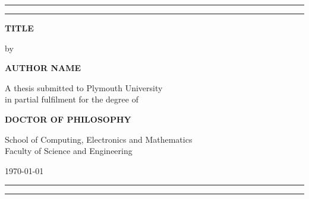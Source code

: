 {\centering
\rule{\textwidth}{1pt}\par %
\vspace{2pt}\vspace{-\baselineskip} %
\rule{\textwidth}{0.4pt}\par %

\vspace*{4\baselineskip}
\centering
\textbf{TITLE}
\vspace*{2\baselineskip}

by
\vspace*{2\baselineskip}

\textbf{AUTHOR NAME}
\vspace*{6\baselineskip}

A thesis submitted to Plymouth University\\
in partial fulfilment for the degree of
\vspace*{2\baselineskip}

\textbf{DOCTOR OF PHILOSOPHY}
\vfill

School of Computing, Electronics and Mathematics\\
Faculty of Science and Engineering
\vspace*{2\baselineskip}

\today

\rule{\textwidth}{0.4pt}\par %
\vspace{2pt}\vspace{-\baselineskip} %
\rule{\textwidth}{1pt}\par} %